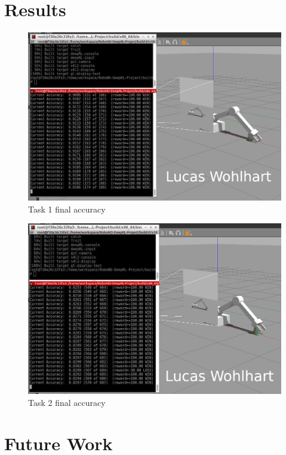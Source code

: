 \documentclass[10pt,journal,compsoc]{IEEEtran}
\begin{document}
\section{Results}  

\begin{figure}[thpb]
    \centering
    \includegraphics[width=0.75\linewidth]{img/task1_final.png}
    \caption{Task 1 final accuracy}
    \label{fig:task1_final}
\end{figure}

\begin{figure}[thpb]
    \centering
    \includegraphics[width=0.75\linewidth]{img/task2_final.png}
    \caption{Task 2 final accuracy}
    \label{fig:task2_final}
\end{figure}


\section{Future Work}  


% 
%
\end{document}
